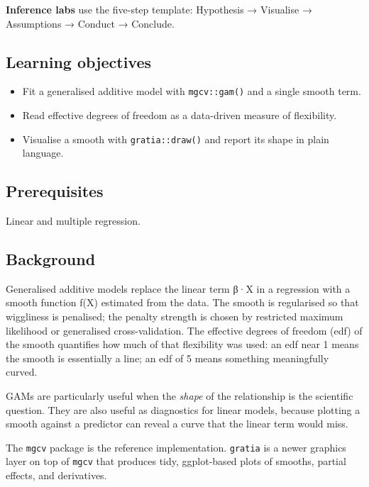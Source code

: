 \documentclass[
]{article}
\author{}
\date{\vspace{-2.5em}}
\providecommand{\tightlist}{%
  \setlength{\itemsep}{0pt}\setlength{\parskip}{0pt}}
\begin{document}
\textbf{Inference labs} use the five-step template: Hypothesis →
Visualise → Assumptions → Conduct → Conclude.

\subsection{Learning objectives}\label{learning-objectives}

\begin{itemize}
\tightlist
\item
  Fit a generalised additive model with \texttt{mgcv::gam()} and a
  single smooth term.
\item
  Read effective degrees of freedom as a data-driven measure of
  flexibility.
\item
  Visualise a smooth with \texttt{gratia::draw()} and report its shape
  in plain language.
\end{itemize}

\subsection{Prerequisites}\label{prerequisites}

Linear and multiple regression.

\subsection{Background}\label{background}

Generalised additive models replace the linear term β·X in a regression
with a smooth function f(X) estimated from the data. The smooth is
regularised so that wiggliness is penalised; the penalty strength is
chosen by restricted maximum likelihood or generalised cross-validation.
The effective degrees of freedom (edf) of the smooth quantifies how much
of that flexibility was used: an edf near 1 means the smooth is
essentially a line; an edf of 5 means something meaningfully curved.

GAMs are particularly useful when the \emph{shape} of the relationship
is the scientific question. They are also useful as diagnostics for
linear models, because plotting a smooth against a predictor can reveal
a curve that the linear term would miss.

The \texttt{mgcv} package is the reference implementation.
\texttt{gratia} is a newer graphics layer on top of \texttt{mgcv} that
produces tidy, ggplot-based plots of smooths, partial effects, and
derivatives.
\end{document}
